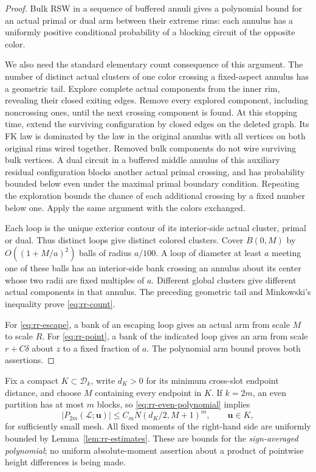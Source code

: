 \begin{proof}
Bulk RSW in a sequence of buffered annuli gives a polynomial bound
for an actual primal or dual arm between their extreme rims: each
annulus has a uniformly positive conditional probability of a
blocking circuit of the opposite color.

We also need the standard elementary count consequence of this
argument.  The number of distinct actual clusters of one color
crossing a fixed-aspect annulus has a geometric tail.  Explore
complete actual components from the inner rim, revealing their
closed exiting edges.  Remove every explored component, including
noncrossing ones, until the next crossing component is found.
At this stopping time, extend the surviving configuration by closed
edges on the deleted graph.  Its FK law is dominated by the law in
the original annulus with all vertices on both original rims
wired together.  Removed bulk
components do not wire surviving bulk vertices.  A dual circuit in
a buffered middle annulus of this auxiliary residual configuration
blocks another actual primal crossing, and has probability bounded
below even under the maximal primal boundary condition.  Repeating the exploration bounds the chance
of each additional crossing by a fixed number below one.  Apply
the same argument with the colors exchanged.

Each loop is the unique exterior contour of its interior-side
actual cluster, primal or dual.  Thus distinct loops give distinct
colored clusters.  Cover $B(0,M)$ by $O((1+M/a)^2)$ balls of radius
$a/100$.  A loop of diameter at least $a$ meeting one of these balls
has an interior-side bank crossing an annulus about its center
whose two radii are fixed multiples of $a$.  Different global
clusters give different actual components in that annulus.
The preceding geometric tail and Minkowski's inequality prove
\eqref{eq:rr-count}.

For \eqref{eq:rr-escape}, a bank of an escaping loop gives an
actual arm from scale $M$ to scale $R$.  For \eqref{eq:rr-point}, a
bank of the indicated loop gives an arm from scale $r+C\delta$
about $z$ to a fixed fraction of $a$.  The polynomial arm bound
proves both assertions.
\end{proof}

Fix a compact $K\subset\mathcal D_k$, write $d_K>0$ for its minimum
cross-slot endpoint distance, and choose $M$ containing every
endpoint in $K$.  If $k=2m$, an even partition has at most $m$
blocks, so \eqref{eq:rr-even-polynomial} implies
\begin{equation}
 |P_{2m}(\mathcal L;\boldsymbol u)|
       \le C_m N(d_K/2,M+1)^m,
 \qquad \boldsymbol u\in K,
 \label{eq:rr-UI}
\end{equation}
for sufficiently small mesh.  All fixed moments of the right-hand
side are uniformly bounded by Lemma~\ref{lem:rr-estimates}.  These
are bounds for the \emph{sign-averaged polynomial}; no uniform
absolute-moment assertion about a product of pointwise height
differences is being made.

